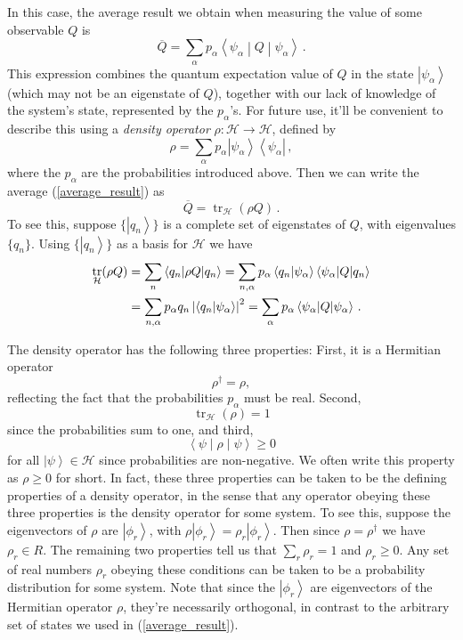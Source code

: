 \documentclass{article}
\theoremstyle{plain}\theoremheaderfont{\normalfont\itshape}\theorembodyfont{\rmfamily}\theoremseparator{.}\newtheorem*{rem}{Remark}\newtheorem*{ex}{Example}\newtheorem*{proof}{Proof}\newtheorem*{altp}{Alternative proof}
\theoremstyle{plain}\theoremheaderfont{\normalfont\bfseries}\theorembodyfont{\rmfamily}\theoremseparator{.}\newtheorem{thm}{Theorem}[section]\newtheorem{lem}[thm]{Lemma}\newtheorem{prop}[thm]{Proposition}\newtheorem*{cor}{Corollary}\newtheorem{defn}[thm]{Definition}\newtheorem{clm}[thm]{Claim}\newtheorem{clminproof}{Claim}
\theoremstyle{break}\theoremheaderfont{\normalfont\itshape}\theorembodyfont{\rmfamily}\theoremseparator{.\medskip}\newtheorem*{proofskip}{Proof}\newtheorem*{exs}{Examples}\newtheorem*{rems}{Remarks}
\theoremstyle{break}\theoremheaderfont{\normalfont\bfseries}\theorembodyfont{\rmfamily}\theoremseparator{.\medskip}\newtheorem{lemskip}[thm]{Lemma}\newtheorem{defnskip}[thm]{Definition}\newtheorem{propskip}[thm]{Proposition}\newtheorem{thmskip}[thm]{Theorem}
\numberwithin{equation}{section}
\newcommand{\bra}[1]{\left\langle #1 \right|}
\newcommand{\ket}[1]{\left| #1 \right\rangle}
\newcommand{\braket}[2]{\left\langle #1 \middle| #2 \right\rangle}
\newcommand{\mel}[3]{\left\langle #1 \middle| #2 \middle| #3 \right\rangle}
\newcommand{\expval}[2]{\left\langle #2 \middle| #1 \middle| #2 \right\rangle}
\newcommand{\abs}[1]{\left| #1 \right|}
\newcommand{\hb}{\mathcal{H}}
\DeclareMathOperator{\tr}{tr}
\begin{document}
    In this case, the average result we obtain when measuring the value of some observable \(Q\) is
    \begin{equation}\label{average_result}
        \overline{Q}=\sum_{\alpha}p_\alpha\expval{Q}{\psi_\alpha}\,.
    \end{equation}
    This expression combines the quantum expectation value of \(Q\) in the state \(\ket{\psi_\alpha}\) (which may not be an eigenstate of \(Q\)), together with our lack of knowledge of the system's state, represented by the \(p_\alpha\)'s. For future use,  it'll be convenient to describe this using a \textit{density operator} \(\rho:\hb\to\hb\), defined by
    \begin{equation}
        \rho=\sum_\alpha p_\alpha\ket{\psi_\alpha}\bra{\psi_\alpha}\,,
    \end{equation}
    where the \(p_\alpha\) are the probabilities introduced above. Then we can write the average (\ref{average_result}) as
    \begin{equation}
        \overline{Q}=\tr_\hb(\rho Q)\,.
    \end{equation}
    To see this, suppose \(\{\ket{q_n}\}\) is a complete set of eigenstates of \(Q\), with eigenvalues \(\{q_n\}\). Using \(\{\ket{q_n}\}\) as a basis for \(\hb\) we have
    \begin{align}
        \tr_\hb(\rho Q)&=\sum_n\expval{\rho Q}{q_n}=\sum_{n,\alpha}p_\alpha\braket{q_n}{\psi_\alpha}\mel{\psi_\alpha}{Q}{q_n}\notag\\
        &=\sum_{n,\alpha}p_\alpha q_n\abs{\braket{q_n}{\psi_\alpha}}^2=\sum_\alpha p_\alpha\expval{Q}{\psi_\alpha}\,.
    \end{align}

    The density operator has the following three properties: First, it is a Hermitian operator
    \begin{equation}
        \rho^\dagger=\rho,
    \end{equation}
    reflecting the fact that the probabilities \(p_\alpha\) must be real. Second,
    \begin{equation}
        \tr_\hb(\rho)=1
    \end{equation}
    since the probabilities sum to one, and third,
    \begin{equation}
        \expval{\rho}{\psi}\ge 0
    \end{equation}
    for all \(\ket{\psi}\in\hb\) since probabilities are non-negative. We often write this property as \(\rho\ge 0\) for short. In fact, these three properties can be taken to be the defining properties of a density operator, in the sense that any operator obeying these three properties is the density operator for some system. To see this, suppose the eigenvectors of \(\rho\) are \(\ket{\phi_r}\), with \(\rho\ket{\phi_r}=\rho_r\ket{\phi_r}\). Then since \(\rho=\rho^\dagger\) we have \(\rho_r\in R\). The remaining two properties tell us that \(\sum_r\rho_r=1\) and \(\rho_r\ge 0\). Any set of real numbers \(\rho_r\) obeying these conditions can be taken to be a probability distribution for some system. Note that since the \(\ket{\phi_r}\) are eigenvectors of the Hermitian operator \(\rho\), they're necessarily orthogonal, in contrast to the arbitrary set of states we used in (\ref{average_result}).
\end{document}
